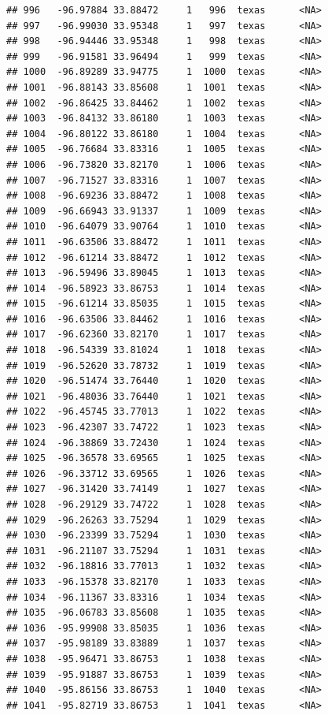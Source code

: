 \documentclass[
]{article}
\begin{document}
\begin{verbatim}
## 996   -96.97884 33.88472     1   996  texas      <NA>
## 997   -96.99030 33.95348     1   997  texas      <NA>
## 998   -96.94446 33.95348     1   998  texas      <NA>
## 999   -96.91581 33.96494     1   999  texas      <NA>
## 1000  -96.89289 33.94775     1  1000  texas      <NA>
## 1001  -96.88143 33.85608     1  1001  texas      <NA>
## 1002  -96.86425 33.84462     1  1002  texas      <NA>
## 1003  -96.84132 33.86180     1  1003  texas      <NA>
## 1004  -96.80122 33.86180     1  1004  texas      <NA>
## 1005  -96.76684 33.83316     1  1005  texas      <NA>
## 1006  -96.73820 33.82170     1  1006  texas      <NA>
## 1007  -96.71527 33.83316     1  1007  texas      <NA>
## 1008  -96.69236 33.88472     1  1008  texas      <NA>
## 1009  -96.66943 33.91337     1  1009  texas      <NA>
## 1010  -96.64079 33.90764     1  1010  texas      <NA>
## 1011  -96.63506 33.88472     1  1011  texas      <NA>
## 1012  -96.61214 33.88472     1  1012  texas      <NA>
## 1013  -96.59496 33.89045     1  1013  texas      <NA>
## 1014  -96.58923 33.86753     1  1014  texas      <NA>
## 1015  -96.61214 33.85035     1  1015  texas      <NA>
## 1016  -96.63506 33.84462     1  1016  texas      <NA>
## 1017  -96.62360 33.82170     1  1017  texas      <NA>
## 1018  -96.54339 33.81024     1  1018  texas      <NA>
## 1019  -96.52620 33.78732     1  1019  texas      <NA>
## 1020  -96.51474 33.76440     1  1020  texas      <NA>
## 1021  -96.48036 33.76440     1  1021  texas      <NA>
## 1022  -96.45745 33.77013     1  1022  texas      <NA>
## 1023  -96.42307 33.74722     1  1023  texas      <NA>
## 1024  -96.38869 33.72430     1  1024  texas      <NA>
## 1025  -96.36578 33.69565     1  1025  texas      <NA>
## 1026  -96.33712 33.69565     1  1026  texas      <NA>
## 1027  -96.31420 33.74149     1  1027  texas      <NA>
## 1028  -96.29129 33.74722     1  1028  texas      <NA>
## 1029  -96.26263 33.75294     1  1029  texas      <NA>
## 1030  -96.23399 33.75294     1  1030  texas      <NA>
## 1031  -96.21107 33.75294     1  1031  texas      <NA>
## 1032  -96.18816 33.77013     1  1032  texas      <NA>
## 1033  -96.15378 33.82170     1  1033  texas      <NA>
## 1034  -96.11367 33.83316     1  1034  texas      <NA>
## 1035  -96.06783 33.85608     1  1035  texas      <NA>
## 1036  -95.99908 33.85035     1  1036  texas      <NA>
## 1037  -95.98189 33.83889     1  1037  texas      <NA>
## 1038  -95.96471 33.86753     1  1038  texas      <NA>
## 1039  -95.91887 33.86753     1  1039  texas      <NA>
## 1040  -95.86156 33.86753     1  1040  texas      <NA>
## 1041  -95.82719 33.86753     1  1041  texas      <NA>

\end{verbatim}
\end{document}
